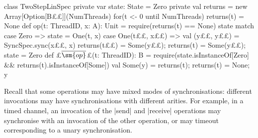 \begin{trivlist}
\item[]
\begin{minipage}{92mm}
\begin{scala}
class TwoStepLinSpec{
  private var state: State = Zero
  private val returns = new Array[Option[B££]](NumThreads)
  for(t <- 0 until NumThreads) returns(t) = None
  def op(t: ThreadID, x: A): Unit = {
    require(returns(t) == None)
    state match{
      case Zero => state = One(t, x)
      case One(t££, x££) => 
        val (y££, y££) = SyncSpec.sync(x££, x) 
        returns(t££) = Some(y££); returns(t) = Some(y££); state = Zero
    }
  }
  def £$\overline{\sm{op}}$£(t: ThreadID): B = {
    require(state.isInstanceOf[Zero] && returns(t).isInstanceOf[Some])
    val Some(y) = returns(t); returns(t) = None; y
  }
}
\end{scala}
\end{minipage}
\hfill 
%
\begin{minipage}{37.8mm}
%
\vspace{40mm}
\end{minipage}%
\end{trivlist}



Recall that some operations may have mixed modes of synchronisations:
different invocations may have synchronisations with different arities.  For
example, in a timed channel, an invocation of the |send| and |receive| operations
may synchronise with an invocation of the other operation, or may timeout
corresponding to a unary synchronisation. 

